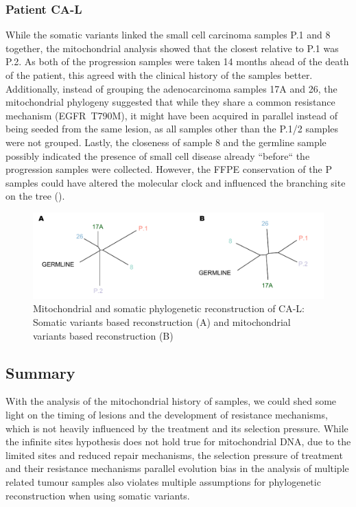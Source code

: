 \subsubsection{Patient CA-L}
While the somatic variants linked the small cell carcinoma samples P.1 and 8 together, the mitochondrial analysis showed that the closest relative to P.1 was P.2. As both of the progression samples were taken 14 months ahead of the death of the patient, this agreed with the clinical history of the samples better. Additionally, instead of grouping the adenocarcinoma samples 17A and 26, the mitochondrial phylogeny suggested that while they share a common resistance mechanism (EGFR~T790M), it might have been acquired in parallel instead of being seeded from the same lesion, as all samples other than the P.1/2 samples were not grouped. Lastly, the closeness of sample 8 and the germline sample possibly indicated the presence of small cell disease already ``before`` the progression samples were collected. However, the FFPE conservation of the P samples could have altered the molecular clock and influenced the branching site on the tree ().

\begin{figure}[ht]
\centering
\includegraphics[width=.99\linewidth]{Figures/CASCADE/mito/CA86SomVsMitoPhylo.pdf}
\caption[Mitochondrial and somatic phylogenetic reconstruction of CA-L]{Mitochondrial and somatic phylogenetic reconstruction of CA-L: Somatic variants based reconstruction (A) and mitochondrial variants based reconstruction (B)} \label{fig:CA86mitoPhylo}
\end{figure}

\subsection{Summary}
With the analysis of the mitochondrial history of samples, we could shed some light on the timing of lesions and the development of resistance mechanisms, which is not heavily influenced by the treatment and its selection pressure. While the infinite sites hypothesis does not hold true for mitochondrial DNA, due to the limited sites and reduced repair mechanisms, the selection pressure of treatment and their resistance mechanisms parallel evolution bias in the analysis of multiple related tumour samples also violates multiple assumptions for phylogenetic reconstruction when using somatic variants. 

